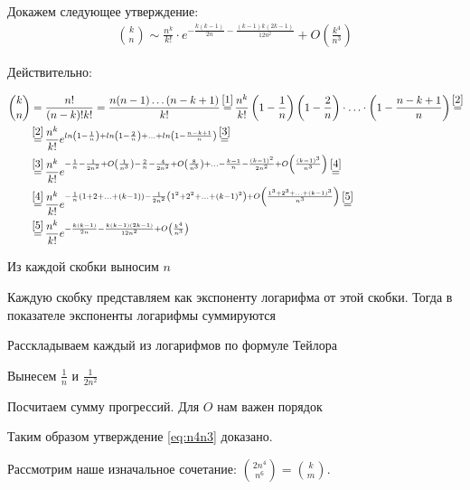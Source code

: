 \documentclass[a4paper, 11pt]{article}
\newcommand{\myeq}[1]{\stackrel{\mathclap{\mbox{[#1]}}}{=}}
\begin{document}
Докажем следующее утверждение:
\begin{equation} \label{eq:n4n3}
\begin{aligned}
\binom{k}{n} \sim \frac{n^k}{k!} \cdot e^{-\frac{k(k-1)}{2n} -\frac{(k-1)k(2k-1)}{12n^2}} + O\left(\frac{k^4}{n^3}\right)
\end{aligned}
\end{equation}

Действительно:

\begin{equation*}
\begin{aligned}
\binom{k}{n} &= \frac{n!}{(n-k)!k!} = \frac{n(n-1)\dots (n-k+1)}{k!} 
\myeq{1} 
	 \frac{n^k}{k!} 
	\left(1-\frac{1}{n}\right)
	\left(1-\frac{2}{n}\right) \cdot \dotsc \cdot
	\left(1-\frac{n - k + 1}{n}\right)
\myeq{2}
\\
&\myeq{2}
	\frac{n^k}{k!} 
	e^{
		ln\left(1-\frac{1}{n}\right) +
		ln\left(1-\frac{2}{n}\right) + \dotsc +
		ln\left(1-\frac{n - k + 1}{n}\right)
	}
\myeq{3}
\\
&\myeq{3}
	\frac{n^k}{k!} 
	e^{
		-\frac{1}{n}-\frac{1}{2n^2}+O\left(\frac{1}{n^3}\right)
		-\frac{2}{n}-\frac{4}{2n^2}+O\left(\frac{8}{n^3}\right) + \dotsc
		-\frac{k-1}{n}-\frac{(k-1)^2}{2n^2}+O\left(\frac{(k-1)^3}{n^3}\right)
	}
\myeq{4}
\\
&\myeq{4}
\frac{n^k}{k!} 
e^{
	-\frac{1}{n}\left(1+2+ \dotsc + (k-1)\right)
	-\frac{1}{2n^2}\left(1^2+2^2+ \dotsc + (k-1)^2\right)
	+O\left(\frac{1^3 + 2^3 + \dotsc + (k-1)^3}{n^3}\right)
}
\myeq{5}
\\
&\myeq{5}
\frac{n^k}{k!} 
e^{
	-\frac{k(k-1)}{2n}-\frac{k(k-1)(2k-1)}{12n^2}+O\left(\frac{k^4}{n^3}\right)
}
\end{aligned}
\end{equation*}

\indent [1] Из каждой скобки выносим $n$

\indent [2] Каждую скобку представляем как экспоненту логарифма от этой скобки. Тогда в показателе экспоненты логарифмы суммируются

\indent [3] Расскладываем каждый из логарифмов по формуле Тейлора

\indent [4] Вынесем $\frac{1}{n}$ и $\frac{1}{2n^2}$

\indent [5] Посчитаем сумму прогрессий. Для $O$ нам важен порядок

Таким образом утверждение \eqref{eq:n4n3} доказано.

Рассмотрим наше изначальное сочетание: $\binom{2n^4}{n^6} = \binom{k}{m}$.
\end{document}
